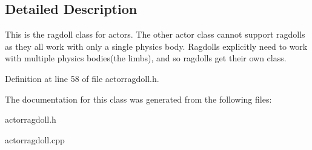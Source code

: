 \subsection{Detailed Description}
This is the ragdoll class for actors. The other actor class cannot support ragdolls as they all work with only a single physics body. Ragdolls explicitly need to work with multiple physics bodies(the limbs), and so ragdolls get their own class. 

Definition at line 58 of file actorragdoll.h.



The documentation for this class was generated from the following files:\begin{DoxyCompactItemize}
\item 
actorragdoll.h\item 
actorragdoll.cpp\end{DoxyCompactItemize}
